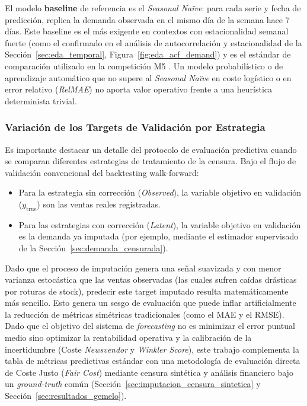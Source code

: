 El modelo \textbf{baseline} de referencia es el \textit{Seasonal Naïve}: para cada serie y fecha de predicción, replica la demanda observada en el mismo día de la semana hace 7 días. Este baseline es el más exigente en contextos con estacionalidad semanal fuerte (como el confirmado en el análisis de autocorrelación y estacionalidad de la Sección~\ref{sec:eda_temporal}, Figura~\ref{fig:eda_acf_demand}) y es el estándar de comparación utilizado en la competición M5 \cite{makridakis2022m5}. Un modelo probabilístico o de aprendizaje automático que no supere al \textit{Seasonal Naïve} en coste logístico o en error relativo (\textit{RelMAE}) no aporta valor operativo frente a una heurística determinista trivial.

\subsubsection{Variación de los Targets de Validación por Estrategia}

Es importante destacar un detalle del protocolo de evaluación predictiva cuando se comparan diferentes estrategias de tratamiento de la censura. Bajo el flujo de validación convencional del backtesting walk-forward:
\begin{itemize}
    \item Para la estrategia sin corrección (\textit{Observed}), la variable objetivo en validación ($y_{\text{true}}$) son las ventas reales registradas.
    \item Para las estrategias con corrección (\textit{Latent}), la variable objetivo en validación es la demanda ya imputada (por ejemplo, mediante el estimador supervisado de la Sección~\ref{sec:demanda_censurada}).
\end{itemize}
Dado que el proceso de imputación genera una señal suavizada y con menor varianza estocástica que las ventas observadas (las cuales sufren caídas drásticas por roturas de stock), predecir este target imputado resulta matemáticamente más sencillo. Esto genera un sesgo de evaluación que puede inflar artificialmente la reducción de métricas simétricas tradicionales (como el MAE y el RMSE). Dado que el objetivo del sistema de \textit{forecasting} no es minimizar el error puntual medio sino optimizar la rentabilidad operativa y la calibración de la incertidumbre (Coste \textit{Newsvendor} y \textit{Winkler Score}), este trabajo complementa la tabla de métricas predictivas estándar con una metodología de evaluación directa de Coste Justo (\textit{Fair Cost}) mediante censura sintética y análisis financiero bajo un \textit{ground-truth} común (Sección~\ref{sec:imputacion_censura_sintetica} y Sección~\ref{sec:resultados_gemelo}).


